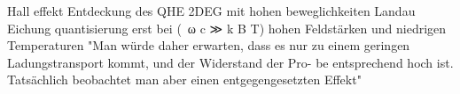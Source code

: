 Hall effekt
Entdeckung des QHE
2DEG mit hohen beweglichkeiten
Landau Eichung
quantisierung erst bei (~ω c ≫ k B T) hohen Feldstärken und niedrigen Temperaturen
"Man
würde daher erwarten, dass es nur zu einem geringen
Ladungstransport kommt, und der Widerstand der Pro-
be entsprechend hoch ist. Tatsächlich beobachtet man
aber einen entgegengesetzten Effekt"


